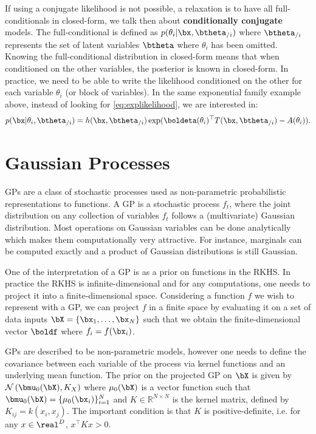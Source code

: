 If using a conjugate likelihood is not possible, a relaxation is to have all full-conditionals in closed-form, we talk then about \textbf{conditionally conjugate} models.
The full-conditional is defined as $p(\theta_i|\bx, \btheta_{/i})$ where $\btheta_{/i}$ represents the set of latent variables $\btheta$ where $\theta_i$ has been omitted.
Knowing the full-conditional distribution in closed-form means that when conditioned on the other variables, the posterior is known in closed-form.
In practice, we need to be able to write the likelihood conditioned on the other for each variable $\theta_i$ (or block of variables).
In the same exponential family example above, instead of looking for \eqref{eq:explikelihood}, we are interested in:
\begin{align*}
    p(\bx|\theta_i, \btheta_{/i}) = h(\bx, \btheta_{/i})\exp(\boldeta(\theta_i)^\top T(\bx, \btheta_{/i}) - A(\theta_i)).
\end{align*}

\section{Gaussian Processes}
\label{sec:gps}
\acf{GPs} are a class of stochastic processes used as non-parametric probabilistic representations to functions.
A \ac{GP} is a stochastic process $f_t$, where the joint distribution on any collection of variables $f_t$ follows a (multivariate) Gaussian distribution.
Most operations on Gaussian variables can be done analytically which makes them computationally very attractive.
For instance, marginals can be computed exactly and a product of Gaussian distributions is still Gaussian.

One of the interpretation of a \ac{GP} is as a prior on functions in the \acf{RKHS}.
In practice the \ac{RKHS} is infinite-dimensional and for any computations, one needs to project it into a finite-dimensional space.
Considering a function $f$ we wish to represent with a \ac{GP}, we can project $f$ in a finite space by evaluating it on a set of data inputs $\bX = \{\bx_1, \ldots, \bx_N\}$ such that we obtain the finite-dimensional vector $\boldf$ where $f_i = f(\bx_i)$.

\ac{GPs} are described to be non-parametric models, however one needs to define the covariance between each variable of the process via kernel functions \needcite and an underlying mean function.
The prior on the projected \ac{GP} on $\bX$ is given by $\mathcal{N}\left(\bmu_0(\bX), K_{X}\right)$ where $\mu_0(\bX)$ is a vector function such that $\bmu_0(\bX) = \{\mu_0(\bx_i)\}_{i=1}^N$ and $K \in \mathbb{R}^{N\times N}$ is the kernel matrix, defined by $K_{ij} = k(x_i, x_j)$.
The important condition is that $K$ is positive-definite, i.e. for any $x\in \real^D$, $x^\top K x > 0$.


